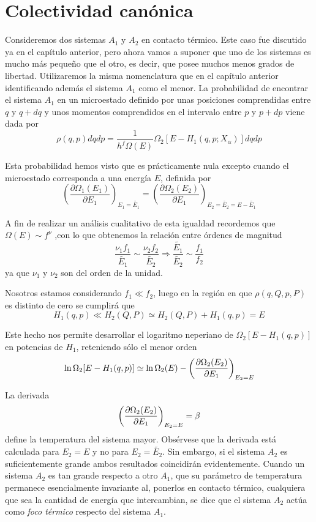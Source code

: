 \newpage
\section{Colectividad canónica}

Consideremos dos sistemas $A_1$ y $A_2$ en contacto térmico. Este caso fue discutido ya en el capítulo anterior, pero ahora vamos a suponer que uno de los sistemas es mucho más pequeño que el otro, es decir, que posee muchos menos grados de libertad.
Utilizaremos la misma nomenclatura que en el capítulo anterior identificando además el sistema $A_1$ como el menor.
La probabilidad de encontrar el sistema $A_1$ en un microestado definido por unas posiciones comprendidas entre $q$ y $q + dq$ y unos momentos comprendidos en el intervalo entre $p$ y $p + dp$ viene dada por
\begin{equation}
	\rho(q,p)dqdp = \frac{1}{h^f \Omega(E)} \Omega_2 \left[ E - H_1(q,p;X_\alpha) \right] dqdp
\end{equation}

Esta probabilidad hemos visto que es prácticamente nula excepto cuando el microestado corresponda a una energía $E$, definida por
$$\left(  \frac{\partial \Omega_1(E_1)}{\partial E_1}\right)_{E_1 = \widetilde{E_1}} = \left(  \frac{\partial \Omega_2(E_2)}{\partial E_1}\right)_{E_2 = \widetilde{E_2} = E-\widetilde{E_1}}$$

A fin de realizar un análisis cualitativo de esta igualdad recordemos que $\Omega(E) \sim f^{\nu}$ ,con lo que obtenemos la relación entre órdenes de magnitud
$$\frac{\nu_1 f_1}{\widetilde{E_1}} \sim \frac{\nu_2 f_2}{\widetilde{E_2}} \Rightarrow \frac{\widetilde{E_1}}{\widetilde{E_2}} \sim \frac{f_1}{f_2}$$
ya que $\nu_1$ y $\nu_2$ son del orden de la unidad.

Nosotros estamos considerando $f_1 \ll f_2$, luego en la región en que $\rho(q,Q,p,P)$ es distinto de cero se cumplirá que
\begin{equation}
	H_1(q,p) \ll H_2(Q,P) \simeq H_2(Q,P) + H_1(q,p) = E
\end{equation}

Este hecho nos permite desarrollar el logaritmo neperiano de $\Omega_2[E - H_1(q, p)]$ en potencias de $H_1$, reteniendo sólo el menor orden
\begin{equation}
	\ln \Omega_2[E - H_1(q, p)] \simeq \ln \Omega_2(E) - \left(  \pdv{\Omega_2(E_2)}{E_1} \right)_{E_2 = E}
\end{equation}

La derivada
$$\left(  \pdv{\Omega_2(E_2)}{E_1} \right)_{E_2 = E} = \beta$$
define la temperatura del sistema mayor.
Obsérvese que la derivada está calculada para $E_2 = E$ y no para $E_2 = \widetilde{E_2}$. Sin embargo, si el sistema $A_2$ es suficientemente grande ambos resultados coincidirán evidentemente.
Cuando un sistema $A_2$ es tan grande respecto a otro $A_1$, que su parámetro de temperatura permanece esencialmente invariante al, ponerlos en contacto térmico, cualquiera que sea la cantidad de energía que intercambian, se dice que el sistema $A_2$ actúa como \emph{foco térmico} respecto del sistema $A_1$.

